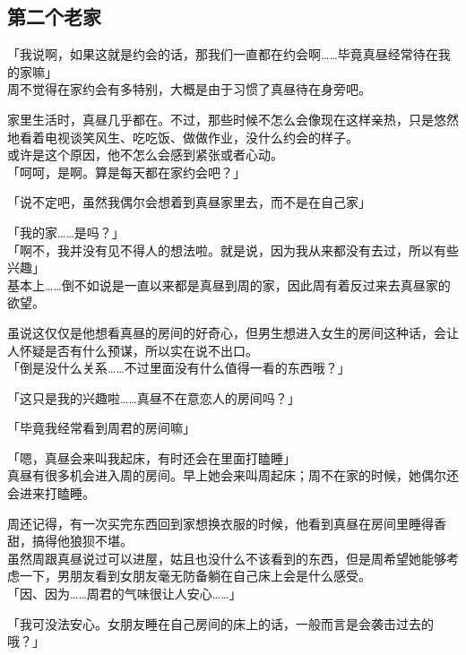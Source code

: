 \subsection{第二个老家}

「我说啊，如果这就是约会的话，那我们一直都在约会啊……毕竟真昼经常待在我的家嘛」\\

周不觉得在家约会有多特别，大概是由于习惯了真昼待在身旁吧。

家里生活时，真昼几乎都在。不过，那些时候不怎么会像现在这样亲热，只是悠然地看着电视谈笑风生、吃吃饭、做做作业，没什么约会的样子。\\

或许是这个原因，他不怎么会感到紧张或者心动。\\

「呵呵，是啊。算是每天都在家约会吧？」

「说不定吧，虽然我偶尔会想着到真昼家里去，而不是在自己家」

「我的家……是吗？」\\

「啊不，我并没有见不得人的想法啦。就是说，因为我从来都没有去过，所以有些兴趣」\\

基本上……倒不如说是一直以来都是真昼到周的家，因此周有着反过来去真昼家的欲望。

虽说这仅仅是他想看真昼的房间的好奇心，但男生想进入女生的房间这种话，会让人怀疑是否有什么预谋，所以实在说不出口。\\

「倒是没什么关系……不过里面没有什么值得一看的东西哦？」

「这只是我的兴趣啦……真昼不在意恋人的房间吗？」

「毕竟我经常看到周君的房间嘛」

「嗯，真昼会来叫我起床，有时还会在里面打瞌睡」\\

真昼有很多机会进入周的房间。早上她会来叫周起床；周不在家的时候，她偶尔还会进来打瞌睡。

周还记得，有一次买完东西回到家想换衣服的时候，他看到真昼在房间里睡得香甜，搞得他狼狈不堪。\\

虽然周跟真昼说过可以进屋，姑且也没什么不该看到的东西，但是周希望她能够考虑一下，男朋友看到女朋友毫无防备躺在自己床上会是什么感受。\\

「因、因为……周君的气味很让人安心……」

「我可没法安心。女朋友睡在自己房间的床上的话，一般而言是会袭击过去的哦？」

